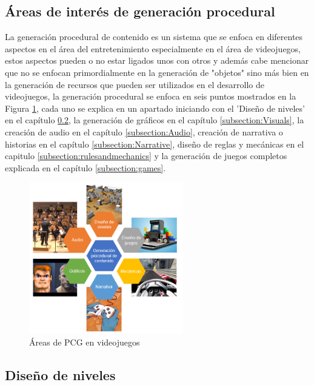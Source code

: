 \subsection{Áreas de interés de generación procedural}
\label{subsection:PCGAreasOfInterest}

La generación procedural de contenido es un sistema que se enfoca en diferentes
aspectos en el área del entretenimiento especialmente en el área de videojuegos,
estos aspectos pueden o no estar ligados unos con otros y además cabe mencionar
que no se enfocan primordialmente en la generación de "objetos" sino más bien en
la generación de recursos que pueden ser utilizados en el desarrollo de
videojuegos, la generación procedural se enfoca en seis puntos mostrados en la
Figura \ref{figure:pcg_areas}, cada uno se explica en un apartado iniciando con
el 'Diseño de niveles' en el capítulo \ref{subsection:LevelDesign}, la
generación de gráficos en el capítulo \ref{subsection:Visuals}, la creación de
audio en el capítulo \ref{subsection:Audio}, creación de narrativa o historias
en el capítulo \ref{subsection:Narrative}, diseño de reglas y mecánicas en el
capitulo \ref{subsection:rulesandmechanics} y la generación de juegos completos
explicada en el capítulo \ref{subsection:games}.

\begin{figure}
    \centering
    \includegraphics[width=0.6\textwidth]{img/pcg_areas_es.png}
    \caption{Áreas de PCG en videojuegos}
    \label{figure:pcg_areas}
\end{figure}

\subsection{Diseño de niveles}
\label{subsection:LevelDesign}

